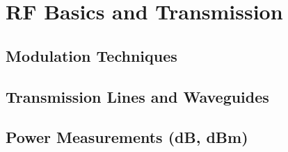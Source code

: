 \section{RF Basics and Transmission} \label{sec:rf_basics}
\subsection{Modulation Techniques} \label{subsec:modulation}
\subsection{Transmission Lines and Waveguides} \label{subsec:transmission_lines}
\subsection{Power Measurements (dB, dBm)} \label{subsec:power_measurement}